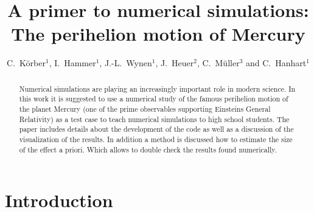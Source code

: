 \documentclass[12pt,ngerman,american]{iopart}
\begin{document}
\title[A primer to numerical simulations]{A primer to numerical simulations: The perihelion motion of Mercury}

\author{
	C.~K\"orber$^{1}$,
	I.~Hammer$^{1}$,
	J.-L.~Wynen$^{1}$,
	J.~Heuer$^{2}$,
	C.~M\"uller$^{3}$ and
	C.~Hanhart$^{1}$
}
\address{
	$^1$ \textit{Institut f\"ur Kernphysik (IKP-3) and Institute for Advanced Simulations (IAS-4), Forschungszentrum J\"ulich, D-52425 J\"ulich, Germany}\\
	$^2$ \textit{Institut f\"ur Neurowissenschaften und Medizin (INM-4), Forschungszentrum J\"ulich, D-52425 J\"ulich, Germany}\\
	$^3$ \textit{JuLab, Forschungszentrum J\"ulich, D-52425 J\"ulich, Germany}
}
\vspace{10pt}

\begin{abstract}
Numerical simulations are playing an increasingly important role in modern science.
In this work it is suggested to use a numerical study of the famous perihelion motion of the planet Mercury (one of the prime observables supporting Einsteins General Relativity) as a test case to teach numerical simulations to high school students.
The paper includes details about the development of the code as well as a discussion of the visualization of the results.
In addition a method is discussed how to estimate the size of the effect a priori. Which allows to double check the results found numerically.
\end{abstract}

%
%
%
% 
%

\section{Introduction}\label{sec:intro}
\end{document}
